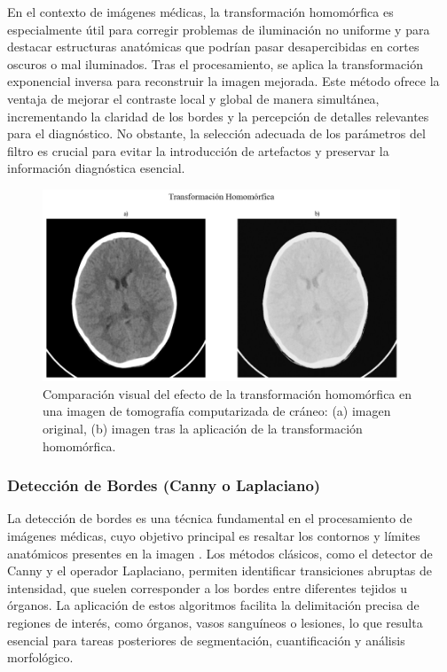 En el contexto de imágenes médicas, la transformación homomórfica es especialmente útil para corregir problemas de iluminación no uniforme y para destacar estructuras anatómicas que podrían pasar desapercibidas en cortes oscuros o mal iluminados. Tras el procesamiento, se aplica la transformación exponencial inversa para reconstruir la imagen mejorada. Este método ofrece la ventaja de mejorar el contraste local y global de manera simultánea, incrementando la claridad de los bordes y la percepción de detalles relevantes para el diagnóstico. No obstante, la selección adecuada de los parámetros del filtro es crucial para evitar la introducción de artefactos y preservar la información diagnóstica esencial.

\begin{figure}[H]
    \centering
    \includegraphics[width=0.95\textwidth]{Graphics/homomorphic.png}
    \caption{Comparación visual del efecto de la transformación homomórfica en una imagen de tomografía computarizada de cráneo: (a) imagen original, (b) imagen tras la aplicación de la transformación homomórfica.}
    \label{fig:filter-homomorphic}
\end{figure}

\subsubsection{Detección de Bordes (Canny o Laplaciano)}

La detección de bordes es una técnica fundamental en el procesamiento de imágenes médicas, cuyo objetivo principal es resaltar los contornos y límites anatómicos presentes en la imagen \cite{CannyBorderDetection,LaplacianBorderDetection}. Los métodos clásicos, como el detector de Canny y el operador Laplaciano, permiten identificar transiciones abruptas de intensidad, que suelen corresponder a los bordes entre diferentes tejidos u órganos. La aplicación de estos algoritmos facilita la delimitación precisa de regiones de interés, como órganos, vasos sanguíneos o lesiones, lo que resulta esencial para tareas posteriores de segmentación, cuantificación y análisis morfológico.

